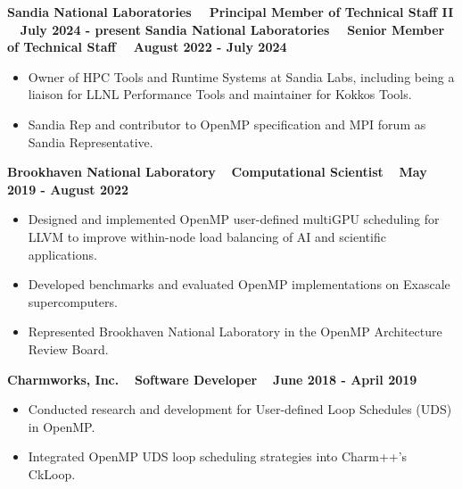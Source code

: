 \vspace{-0.2in}
\textbf{{Sandia National Laboratories $\>$$\>$$\>$  Principal Member of Technical Staff II $\>$$\>$$\>$ July 2024 - present}} \textbf{ Sandia National Laboratories $\>$$\>$$\>$ Senior Member of Technical Staff $\>$$\>$$\>$ August 2022 - July 2024}
\vspace{-0.2in}
\begin{itemize}
\item Owner of HPC Tools and Runtime Systems at Sandia Labs, including being a liaison for LLNL Performance Tools and maintainer for Kokkos Tools. 
\item Sandia Rep and contributor to OpenMP specification and MPI forum as Sandia Representative. 
\end{itemize} 

\textbf{{Brookhaven National Laboratory $\>$$\>$$\>$$\>$Computational Scientist$\>$$\>$$\>$$\>$ May 2019 - August 2022}}
\vspace{-0.2in}
\begin{itemize}
   \item Designed and implemented OpenMP user-defined multiGPU scheduling for LLVM to improve within-node load balancing of AI and scientific applications. 
   \item Developed benchmarks and evaluated OpenMP implementations on Exascale supercomputers.
   \item Represented Brookhaven National Laboratory in the OpenMP Architecture Review Board. 
\end{itemize}

\textbf{Charmworks, Inc. $\>$$\>$$\>$$\>$Software Developer$\>$$\>$$\>$$\>$ June 2018 - April 2019}
\vspace{-0.2in}
\begin{itemize}
\item Conducted research and development for User-defined Loop Schedules (UDS) in OpenMP.
\item Integrated OpenMP UDS loop scheduling strategies into Charm++'s CkLoop. 
\end{itemize}
